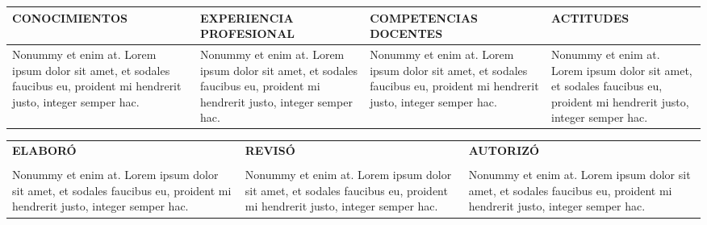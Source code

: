 \documentclass[10pt]{article}
\begin{document}
\begin{enumerate}
    \begin{tabular}{|p{}|p{}|p{}|p{}|}
      \hline
      \textbf{CONOCIMIENTOS} & \textbf{EXPERIENCIA PROFESIONAL} &\textbf{COMPETENCIAS DOCENTES} & \textbf{ACTITUDES}
      \\\hline
      Nonummy et enim at. Lorem ipsum dolor sit amet, et sodales faucibus eu, proident mi hendrerit justo, integer semper hac. 
      & 
      Nonummy et enim at. Lorem ipsum dolor sit amet, et sodales faucibus eu, proident mi hendrerit justo, integer semper hac.  
      &
      Nonummy et enim at. Lorem ipsum dolor sit amet, et sodales faucibus eu, proident mi hendrerit justo, integer semper hac. 
      & 
      Nonummy et enim at. Lorem ipsum dolor sit amet, et sodales faucibus eu, proident mi hendrerit justo, integer semper hac.
      \\\hline
    \end{tabular}
\end{enumerate}

  \begin{tabular}{p{}p{}p{}}

      \centering
      \textbf{ELABORÓ} 
      &
      \centering
      \textbf{REVISÓ} 
      &
      \centering
      \textbf{AUTORIZÓ}\\
      &&&\\

      \centering
      \hline 
      Nonummy et enim at. Lorem ipsum dolor sit amet, et sodales faucibus eu, proident mi hendrerit justo, integer semper hac.
      &
      \centering
      \hline 
      Nonummy et enim at. Lorem ipsum dolor sit amet, et sodales faucibus eu, proident mi hendrerit justo, integer semper hac.
      &
      \centering
      \hline 
       Nonummy et enim at. Lorem ipsum dolor sit amet, et sodales faucibus eu, proident mi hendrerit justo, integer semper hac.
  \end{tabular}
\end{document}
